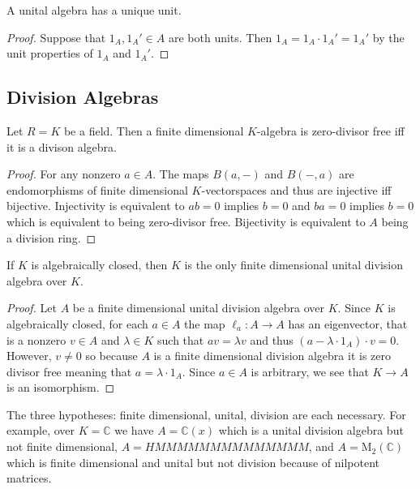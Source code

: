 \documentclass[12pt]{extarticle}
\begin{document}
\begin{prop}
A unital algebra has a unique unit. 
\end{prop}

\begin{proof}
Suppose that $1_A, 1_A' \in A$ are both units. Then $1_A = 1_A \cdot 1_A' = 1_A'$ by the unit properties of $1_A$ and $1_A'$.
\end{proof}


\subsection{Division Algebras}

\begin{prop}
Let $R = K$ be a field. Then a finite dimensional $K$-algebra is zero-divisor free iff it is a divison algebra.
\end{prop}

\begin{proof}
For any nonzero $a \in A$. The maps $B(a, -)$ and $B(-, a)$ are endomorphisms of finite dimensional $K$-vectorspaces and thus are injective iff bijective. Injectivity is equivalent to $ab = 0$ implies $b = 0$ and $ba = 0$ implies $b = 0$ which is equivalent to being zero-divisor free. Bijectivity is equivalent to $A$ being a division ring.
\end{proof}

\begin{prop}
If $K$ is algebraically closed, then $K$ is the only finite dimensional unital division algebra over $K$.
\end{prop}

\begin{proof}
Let $A$ be a finite dimensional unital division algebra over $K$.
Since $K$ is algebraically closed, for each $a \in A$ the map $\ell_a : A \to A$ has an eigenvector, that is a nonzero $v \in A$ and $\lambda \in K$ such that $a v = \lambda v$ and thus $(a - \lambda \cdot 1_A) \cdot v = 0$. However, $v \neq 0$ so because $A$ is a finite dimensional division algebra it is zero divisor free meaning that $a = \lambda \cdot 1_A$. Since $a \in A$ is arbitrary, we see that $K \to A$ is an isomorphism.
\end{proof}

\newcommand{\C}{\mathbb{C}}

\begin{rmk}
The three hypotheses: finite dimensional, unital, division are each necessary. For example, over $K = \C$ we have $A = \C(x)$ which is a unital division algebra but not finite dimensional, $A = HMMMMMMMMMMMMMM$, and $A = \mathrm{M}_2(\C)$ which is finite dimensional and unital but not division because of nilpotent matrices.
\end{rmk}
\end{document}
